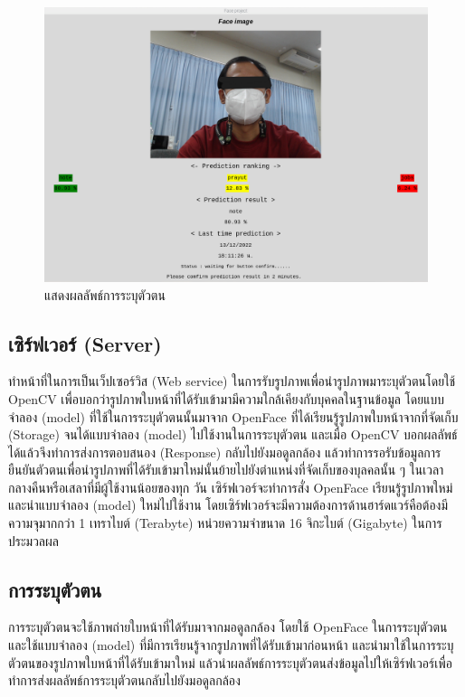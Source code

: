 \begin{figure}[!ht]
  \begin{center}
    \includegraphics[scale=.45]{pic/result_page_blind.png}
  \caption[แสดงผลลัพธ์การระบุตัวตน]{แสดงผลลัพธ์การระบุตัวตน}
  \end{center}
  \label{fig:predict_result}
\end{figure}


\subsection{เซิร์ฟเวอร์ (Server)}
ทำหน้าที่ในการเป็นเว็ปเซอร์วิส (Web service) ในการรับรูปภาพเพื่อนำรูปภาพมาระบุตัวตนโดยใช้ OpenCV
เพื่อบอกว่ารูปภาพใบหน้าที่ได้รับเข้ามามีความใกล้เคียงกับบุคคลในฐานข้อมูล โดยแบบจำลอง (model) ที่ใช้ในการระบุตัวตนนั้นมาจาก OpenFace ที่ได้เรียนรู้รูปภาพใบหน้าจากที่จัดเก็บ (Storage) 
จนได้แบบจำลอง (model) ไปใช้งานในการระบุตัวตน และเมื่อ OpenCV บอกผลลัพธ์ได้แล้วจึงทำการส่งการตอบสนอง (Response) 
กลับไปยังมอดูลกล้อง แล้วทำการรอรับข้อมูลการยืนยันตัวตนเพื่อนำรูปภาพที่ได้รับเข้ามาใหม่นั้นย้ายไปยังตำแหน่งที่จัดเก็บของบุลคลนั้น ๆ ในเวลากลางคืนหรือเสลาที่มีผู้ใช้งานน้อยของทุก 
วัน เซิร์ฟเวอร์จะทำการสั่ง OpenFace เรียนรู้รูปภาพใหม่ และนำแบบจำลอง (model) ใหม่ไปใช้งาน โดยเซิร์ฟเวอร์จะมีความต้องการด้านฮาร์ดแวร์คือต้องมีความจุมากกว่า 1 เทราไบต์  (Terabyte) 
หน่วยความจำขนาด 16 จิกะไบต์ (Gigabyte) ในการประมวลผล

\subsection{การระบุตัวตน}
การระบุตัวตนจะใช้ภาพถ่ายใบหน้าที่ได้รับมาจากมอดูลกล้อง โดยใช้ OpenFace ในการระบุตัวตน และใช้แบบจำลอง (model) ที่มีการเรียนรู้จากรูปภาพที่ได้รับเข้ามาก่อนหน้า 
และนำมาใช้ในการระบุตัวตนของรูปภาพใบหน้าที่ได้รับเข้ามาใหม่ แล้วนำผลลัพธ์การระบุตัวตนส่งข้อมูลไปให้เซิร์ฟเวอร์เพื่อทำการส่งผลลัพธ์การระบุตัวตนกลับไปยังมอดูลกล้อง

